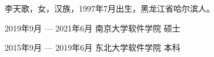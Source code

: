 \documentclass[winfonts,master,twoside]{njuthesis}
\begin{document}
\backmatter
\begin{resume}
\begin{authorinfo}
\noindent 李天歌，女，汉族，1997年7月出生，黑龙江省哈尔滨人。
\end{authorinfo}
\begin{education}
\item[2019年9月 --- 2021年6月] 南京大学软件学院 \hfill 硕士
\item[2015年9月 --- 2019年6月] 东北大学软件学院 \hfill 本科
\end{education}
\end{resume}


\end{document}
